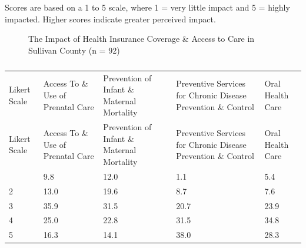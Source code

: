 \documentclass[
  english,
  letterpaper,
]{report}
\begin{document}
\begin{tcolorbox}[enhanced jigsaw, breakable, leftrule=.75mm, title=\textcolor{quarto-callout-note-color}{\faInfo}\hspace{0.5em}{Note}, bottomrule=.15mm, opacityback=0, left=2mm, colback=white, bottomtitle=1mm, coltitle=black, colbacktitle=quarto-callout-note-color!10!white, colframe=quarto-callout-note-color-frame, opacitybacktitle=0.6, toptitle=1mm, titlerule=0mm, arc=.35mm, rightrule=.15mm, toprule=.15mm]

Scores are based on a 1 to 5 scale, where 1 = very little impact and 5 =
highly impacted. Higher scores indicate greater perceived impact.

\end{tcolorbox}

\begin{figure}


\caption{\label{fig-sc-impact-hlthinsur-access}The Impact of Health
Insurance Coverage \& Access to Care in Sullivan County (n = 92)}

\end{figure}%

\begin{longtable}[]{@{}lllll@{}}

\caption{\label{tbl-sc-impact-hlthinsur-access}The Impact of Health
Insurance Coverage \& Access to Care in Sullivan County (n = 92)}

\tabularnewline

\caption{}\label{T_9bd2f}\tabularnewline
\toprule\noalign{}
Likert Scale & Access To \& Use of Prenatal Care & Prevention of Infant
\& Maternal Mortality & Preventive Services for Chronic Disease
Prevention \& Control & Oral Health Care \\
\midrule\noalign{}
\endfirsthead
\toprule\noalign{}
Likert Scale & Access To \& Use of Prenatal Care & Prevention of Infant
\& Maternal Mortality & Preventive Services for Chronic Disease
Prevention \& Control & Oral Health Care \\
\midrule\noalign{}
\endhead
\bottomrule\noalign{}
\endlastfoot
1 & 9.8 & 12.0 & 1.1 & 5.4 \\
2 & 13.0 & 19.6 & 8.7 & 7.6 \\
3 & 35.9 & 31.5 & 20.7 & 23.9 \\
4 & 25.0 & 22.8 & 31.5 & 34.8 \\
5 & 16.3 & 14.1 & 38.0 & 28.3 \\

\end{longtable}
\end{document}
